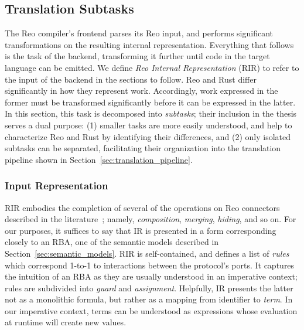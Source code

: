 \subsection{Translation Subtasks}
\label{sec:sub_tasks}
The Reo compiler's frontend parses its Reo input, and performs significant transformations on the resulting internal representation. Everything that follows is the task of the backend, transforming it further until code in the target language can be emitted. We define \textit{Reo Internal Representation} (RIR) to refer to the input of the backend in the sections to follow. Reo and Rust differ significantly in how they represent work. Accordingly, work expressed in the former must be transformed significantly before it can be expressed in the latter. In this section, this task is decomposed into \textit{subtasks}; their inclusion in the thesis serves a dual purpose: (1) smaller tasks are more easily understood, and help to characterize Reo and Rust by identifying their differences, and (2) only isolated subtasks can be separated, facilitating their organization into the translation pipeline shown in Section~\ref{sec:translation_pipeline}.

\subsubsection{Input Representation}
RIR embodies the completion of several of the operations on Reo connectors described in the literature~\cite{baier2006modeling, dokter2018rule}; namely, \textit{composition}, \textit{merging}, \textit{hiding}, and so on. For our purposes, it suffices to say that IR is presented in a form corresponding closely to an RBA, one of the semantic models described in Section~\ref{sec:semantic_models}. RIR is self-contained, and defines a list of \textit{rules} which correspond 1-to-1 to interactions between the protocol's ports. It captures the intuition of an RBA as they are usually understood in an imperative context; rules are subdivided into \textit{guard} and \textit{assignment}. Helpfully, IR presents the latter not as a monolithic formula, but rather as a mapping from identifier to \textit{term}. In our imperative context, terms can be understood as expressions whose evaluation at runtime will create new values.

